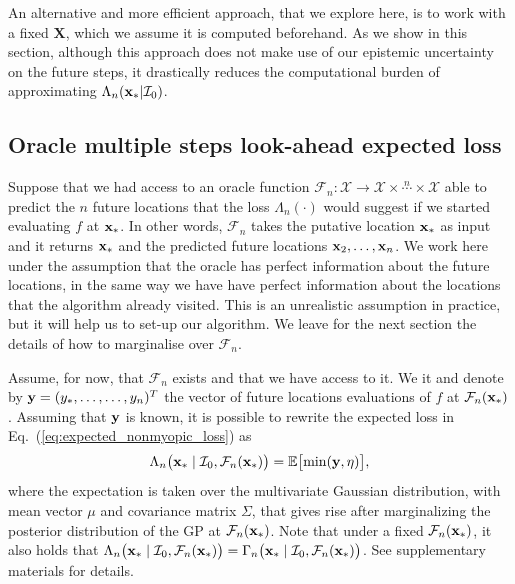 \documentclass[twoside]{article}
\newcommand{\I}{\mathcal{I}}
\newcommand{\E}{\mathbb{E}}
\newcommand{\future}{\mathcal{F}}
\begin{document}
An alternative and more efficient approach, that we explore here, is to work with a fixed $\textbf{X}$, which we assume it is computed beforehand. As we show in this section, although this approach does not make use of our epistemic uncertainty on the future steps, it drastically reduces the computational burden of approximating $\Lambda_n(\latentVector_*|\I_0 )$. 



\subsection{Oracle multiple steps look-ahead expected loss}



Suppose that  we had access to an oracle function $\future_{n}: {\mathcal X}\rightarrow  {\mathcal X}\times \overset{n}{\cdots}\times {\mathcal X}$ able to predict the $n$ future  locations that the loss $\Lambda_n(\cdot)$ would suggest if we started evaluating $f$ at $\mathbf{x}_*$. In other words, $\future_{n}$ takes the putative location $\mathbf{x}_*$ as input and it returns $\mathbf{x}_*$ and the predicted future locations  $\mathbf{x}_2,\dots, \mathbf{x}_n$. We work here under the assumption that the oracle has perfect information about the future locations, in the same way we have have perfect information about the locations that the algorithm already visited. This is an unrealistic assumption in practice, but it will help us to set-up our algorithm. We leave for the next section the details of how to marginalise over $\future_{n}$. 

Assume, for now, that $\future_{n}$ exists and that we have access to it. We it and denote by $\mathbf{y}=(y_*,\dots,\dots,y_n)^T$ the vector of future locations evaluations of $f$ at $\future_n(\latentVector_*)$. Assuming that $\mathbf{y}$ is known, it is possible to rewrite the expected loss in Eq.~(\ref{eq:expected_nonmyopic_loss}) as
\begin{equation}\label{eq:oracle_expected_nonmyopic_loss}
\Lambda_n \bigl(\latentVector_* \mid \I_0, \future_{n}(\latentVector_*) \bigr) = \E \bigl[\min (\dataVector,\eta) \bigr], 
\end{equation}
where the expectation is taken over the multivariate Gaussian distribution, with mean vector $\mu$ and covariance matrix $\Sigma$, that gives rise after marginalizing the posterior distribution of the GP at $\future_{n}(\latentVector_*)$. Note that under a fixed $\future_{n}(\latentVector_*)$, it also holds that 
$
\Lambda_n \bigl(\latentVector_* \mid \I_0, \future_{n}(\latentVector_*) \bigr) 
= 
\Gamma_n \bigl(\latentVector_* \mid \I_0,\future_{n}(\latentVector_*) \bigr)
$. 
See supplementary materials for details.
\end{document}
